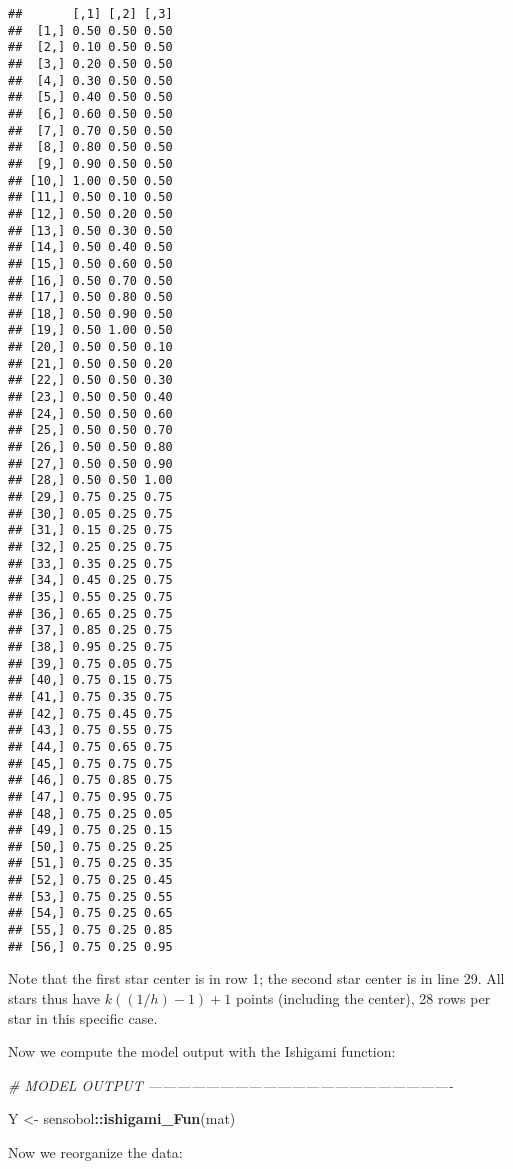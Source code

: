 \documentclass[11pt,]{article}
\newenvironment{Shaded}{\begin{snugshade}}{\end{snugshade}}
\newcommand{\CommentTok}[1]{\textcolor[rgb]{0.56,0.35,0.01}{\textit{#1}}}
\newcommand{\KeywordTok}[1]{\textcolor[rgb]{0.13,0.29,0.53}{\textbf{#1}}}
\newcommand{\NormalTok}[1]{#1}
\newcommand{\OperatorTok}[1]{\textcolor[rgb]{0.81,0.36,0.00}{\textbf{#1}}}
\newcommand{\StringTok}[1]{\textcolor[rgb]{0.31,0.60,0.02}{#1}}
\begin{document}
\begin{verbatim}
##       [,1] [,2] [,3]
##  [1,] 0.50 0.50 0.50
##  [2,] 0.10 0.50 0.50
##  [3,] 0.20 0.50 0.50
##  [4,] 0.30 0.50 0.50
##  [5,] 0.40 0.50 0.50
##  [6,] 0.60 0.50 0.50
##  [7,] 0.70 0.50 0.50
##  [8,] 0.80 0.50 0.50
##  [9,] 0.90 0.50 0.50
## [10,] 1.00 0.50 0.50
## [11,] 0.50 0.10 0.50
## [12,] 0.50 0.20 0.50
## [13,] 0.50 0.30 0.50
## [14,] 0.50 0.40 0.50
## [15,] 0.50 0.60 0.50
## [16,] 0.50 0.70 0.50
## [17,] 0.50 0.80 0.50
## [18,] 0.50 0.90 0.50
## [19,] 0.50 1.00 0.50
## [20,] 0.50 0.50 0.10
## [21,] 0.50 0.50 0.20
## [22,] 0.50 0.50 0.30
## [23,] 0.50 0.50 0.40
## [24,] 0.50 0.50 0.60
## [25,] 0.50 0.50 0.70
## [26,] 0.50 0.50 0.80
## [27,] 0.50 0.50 0.90
## [28,] 0.50 0.50 1.00
## [29,] 0.75 0.25 0.75
## [30,] 0.05 0.25 0.75
## [31,] 0.15 0.25 0.75
## [32,] 0.25 0.25 0.75
## [33,] 0.35 0.25 0.75
## [34,] 0.45 0.25 0.75
## [35,] 0.55 0.25 0.75
## [36,] 0.65 0.25 0.75
## [37,] 0.85 0.25 0.75
## [38,] 0.95 0.25 0.75
## [39,] 0.75 0.05 0.75
## [40,] 0.75 0.15 0.75
## [41,] 0.75 0.35 0.75
## [42,] 0.75 0.45 0.75
## [43,] 0.75 0.55 0.75
## [44,] 0.75 0.65 0.75
## [45,] 0.75 0.75 0.75
## [46,] 0.75 0.85 0.75
## [47,] 0.75 0.95 0.75
## [48,] 0.75 0.25 0.05
## [49,] 0.75 0.25 0.15
## [50,] 0.75 0.25 0.25
## [51,] 0.75 0.25 0.35
## [52,] 0.75 0.25 0.45
## [53,] 0.75 0.25 0.55
## [54,] 0.75 0.25 0.65
## [55,] 0.75 0.25 0.85
## [56,] 0.75 0.25 0.95
\end{verbatim}

Note that the first star center is in row 1; the second star center is
in line 29. All stars thus have \(k((1/h) - 1)+1\) points (including the
center), 28 rows per star in this specific case.

Now we compute the model output with the Ishigami function:

\begin{Shaded}
\begin{Highlighting}[]
\CommentTok{# MODEL OUTPUT ----------------------------------------------------------------}

\NormalTok{Y <-}\StringTok{ }\NormalTok{sensobol}\OperatorTok{::}\KeywordTok{ishigami_Fun}\NormalTok{(mat)}
\end{Highlighting}
\end{Shaded}

Now we reorganize the data:
\end{document}
